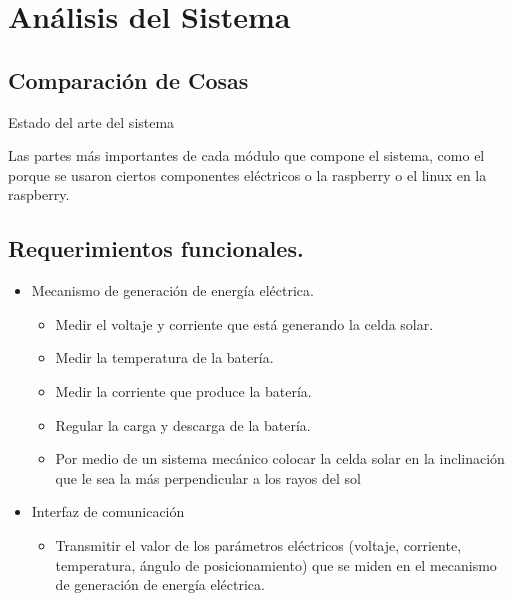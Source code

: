 \chapter{Análisis del Sistema} 

\section{Comparación de Cosas }

Estado del arte  del sistema

Las partes más importantes de cada módulo que compone el sistema, como el porque se usaron ciertos componentes eléctricos o la raspberry o el linux en la raspberry.  

\section{Requerimientos funcionales.}
\begin{itemize}
    \item Mecanismo de generación de energía eléctrica.
    \begin{itemize}
        \item Medir el voltaje y corriente que está generando la celda solar.
        \item Medir la temperatura de la batería.
        \item Medir la corriente que produce la batería.
        \item Regular la carga y descarga de la batería.
        \item Por medio de un sistema mecánico colocar la celda solar en la inclinación  que le sea la más perpendicular a los rayos del sol
    \end{itemize}
\end{itemize}

\begin{itemize}
    \item Interfaz de comunicación
    \begin{itemize}
     \item Transmitir el valor de los parámetros eléctricos (voltaje, corriente, temperatura, ángulo de posicionamiento) que se miden en el mecanismo de generación de energía eléctrica. 
    \end{itemize}
\end{itemize}

